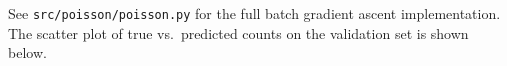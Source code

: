 \begin{answer}
See \texttt{src/poisson/poisson.py} for the full batch gradient ascent implementation. The scatter plot of true vs.\ predicted counts on the validation set is shown below.
\end{answer}
